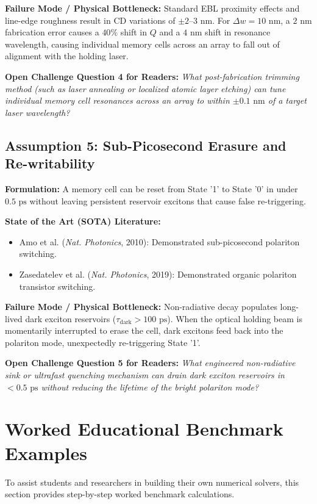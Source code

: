 \documentclass[11pt,a4paper]{article}
\begin{document}
\textbf{Failure Mode / Physical Bottleneck:}
Standard EBL proximity effects and line-edge roughness result in CD variations of $\pm 2\text{--}3\text{ nm}$. For $\Delta w = 10\text{ nm}$, a $2\text{ nm}$ fabrication error causes a $40\%$ shift in $Q$ and a $4\text{ nm}$ shift in resonance wavelength, causing individual memory cells across an array to fall out of alignment with the holding laser.

\textbf{Open Challenge Question 4 for Readers:}
\textit{What post-fabrication trimming method (such as laser annealing or localized atomic layer etching) can tune individual memory cell resonances across an array to within $\pm 0.1\text{ nm}$ of a target laser wavelength?}

\subsection{Assumption 5: Sub-Picosecond Erasure and Re-writability}
\textbf{Formulation:} A memory cell can be reset from State '1' to State '0' in under $0.5\text{ ps}$ without leaving persistent reservoir excitons that cause false re-triggering.

\textbf{State of the Art (SOTA) Literature:}
\begin{itemize}
    \item Amo et al. (\textit{Nat. Photonics}, 2010): Demonstrated sub-picosecond polariton switching.
    \item Zasedatelev et al. (\textit{Nat. Photonics}, 2019): Demonstrated organic polariton transistor switching.
\end{itemize}

\textbf{Failure Mode / Physical Bottleneck:}
Non-radiative decay populates long-lived dark exciton reservoirs ($\tau_{\text{dark}} > 100\text{ ps}$). When the optical holding beam is momentarily interrupted to erase the cell, dark excitons feed back into the polariton mode, unexpectedly re-triggering State '1'.

\textbf{Open Challenge Question 5 for Readers:}
\textit{What engineered non-radiative sink or ultrafast quenching mechanism can drain dark exciton reservoirs in $<0.5\text{ ps}$ without reducing the lifetime of the bright polariton mode?}

\section{Worked Educational Benchmark Examples}

To assist students and researchers in building their own numerical solvers, this section provides step-by-step worked benchmark calculations.
\end{document}

